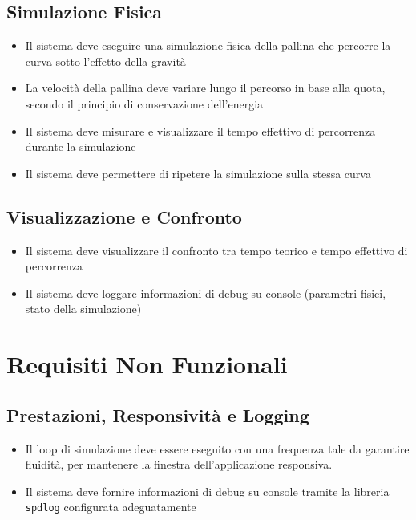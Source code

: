 \documentclass[a4paper,12pt]{article} %
\begin{document}
\subsection{Simulazione Fisica}

\begin{itemize}
    \item Il sistema deve eseguire una simulazione fisica della pallina che percorre la curva sotto l'effetto della gravità
    \item La velocità della pallina deve variare lungo il percorso in base alla quota, secondo il principio di conservazione dell'energia
    \item Il sistema deve misurare e visualizzare il tempo effettivo di percorrenza durante la simulazione
    \item Il sistema deve permettere di ripetere la simulazione sulla stessa curva
\end{itemize}

\subsection{Visualizzazione e Confronto}

\begin{itemize}
    \item Il sistema deve visualizzare il confronto tra tempo teorico e tempo effettivo di percorrenza
    \item Il sistema deve loggare informazioni di debug su console (parametri fisici, stato della simulazione)
\end{itemize}

\section{Requisiti Non Funzionali}

\subsection{Prestazioni, Responsività e Logging}

\begin{itemize}
    \item Il loop di simulazione deve essere eseguito con una frequenza tale da garantire fluidità, per mantenere la finestra dell'applicazione responsiva.
    \item Il sistema deve fornire informazioni di debug su console tramite la libreria \texttt{spdlog} configurata adeguatamente
\end{itemize}
\end{document}
